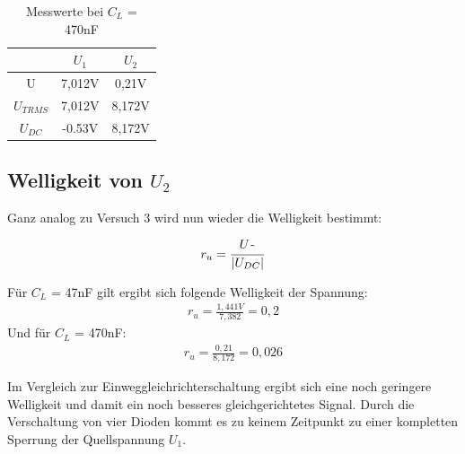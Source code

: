 \documentclass{article}
\begin{document}
\begin{table}[h]
  \begin{center}
\begin{tabular}{|c|c|c|}
  \hline
  & $U_{1}$ & $U_{2}$  \\
  \hline
  U\raisebox{-0.9ex}{\~{}} & 7,012V & 0,21V\\
  \hline
  $U_{TRMS}$ & 7,012V & 8,172V\\
  \hline
  $U_{DC}$ & -0.53V  & 8,172V\\
  \hline
\end{tabular}
\caption{Messwerte bei $C_L$ = 470nF}
\end{center}
\end{table}

\subsection{Welligkeit von $U_2$}

Ganz analog zu Versuch 3 wird nun wieder die Welligkeit bestimmt:

\begin{align*}
  r_u = \frac{U\raisebox{-0.9ex}{\~{}}}{|U_{DC}|}
\end{align*}

Für $C_L$ = 47nF gilt ergibt sich folgende Welligkeit der Spannung:
\begin{align*}
  r_u = \frac{1,441V}{7,382} = 0,2
\end{align*}
Und für $C_L$ = 470nF:
\begin{align*}
  r_u = \frac{0,21}{8,172} = 0,026
\end{align*}

Im Vergleich zur Einweggleichrichterschaltung ergibt sich eine noch geringere Welligkeit und damit ein noch besseres gleichgerichtetes Signal.
Durch die Verschaltung von vier Dioden kommt es zu keinem Zeitpunkt zu einer kompletten Sperrung der Quellspannung $U_1$.
\end{document}
